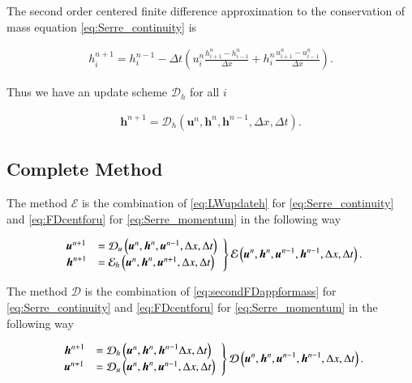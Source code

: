 \documentclass[times]{elsarticle}
\begin{document}
The second order centered finite difference approximation to the conservation of mass equation \eqref{eq:Serre_continuity} is
\begin{linenomath*}
	\begin{gather*}
	h^{n+1}_i = h^{n-1}_i - \Delta t \left(u^{n}_{i}\frac{h^{n}_{i+1} - h^{n}_{i-1}}{\Delta x} + h^{n}_{i}\frac{u^{n}_{i+1} - u^{n}_{i-1}}{\Delta x}\right).
	\end{gather*}
\end{linenomath*}
Thus we have an update scheme $\mathcal{D}_h$ for all $i$
\begin{linenomath*}
	\begin{gather}
	\label{eq:secondFDappformass}
	\boldsymbol{h}^{n+1} = \mathcal{D}_h\left(\boldsymbol{u}^n,\boldsymbol{h}^n,\boldsymbol{h}^{n-1} ,\Delta x, \Delta t \right).
	\end{gather}
\end{linenomath*}

\subsection{Complete Method}
The method $\mathcal{E}$ is the combination of \eqref{eq:LWupdateh} for \eqref{eq:Serre_continuity} and \eqref{eq:FDcentforu} for \eqref{eq:Serre_momentum} in the following way
\begin{linenomath*}
	\begin{gather}
	\left.
	\begin{array}{l l}
	\boldsymbol{u}^{n+1}&=\mathcal{D}_u\left(\boldsymbol{u}^n,\boldsymbol{h}^n, \boldsymbol{u}^{n-1}, \Delta x, \Delta t \right) \\
	\boldsymbol{h}^{n+1}&=\mathcal{E}_h\left(\boldsymbol{u}^n,\boldsymbol{h}^n,\boldsymbol{u}^{n+1}, \Delta x, \Delta t \right)
	\end{array} \right\rbrace \mathcal{E}\left(\boldsymbol{u}^n,\boldsymbol{h}^n, \boldsymbol{u}^{n-1},\boldsymbol{h}^{n-1}, \Delta x, \Delta t \right).	 
	\end{gather}
\end{linenomath*}

The method $\mathcal{D}$ is the combination of \eqref{eq:secondFDappformass} for \eqref{eq:Serre_continuity} and \eqref{eq:FDcentforu} for \eqref{eq:Serre_momentum} in the following way
\begin{linenomath*}
	\begin{gather}
	\left.
	\begin{array}{l l}
	\boldsymbol{h}^{n+1}&=\mathcal{D}_h\left(\boldsymbol{u}^n,\boldsymbol{h}^n,\boldsymbol{h}^{n-1} \Delta x, \Delta t \right) \\
	\boldsymbol{u}^{n+1}&=\mathcal{D}_u\left(\boldsymbol{u}^n,\boldsymbol{h}^n, \boldsymbol{u}^{n-1}, \Delta x, \Delta t \right)
	\end{array} \right\rbrace \mathcal{D}\left(\boldsymbol{u}^n,\boldsymbol{h}^n, \boldsymbol{u}^{n-1},\boldsymbol{h}^{n-1}, \Delta x, \Delta t \right).
	\label{eq:Gnumdef}
	\end{gather}
\end{linenomath*}
\end{document}
